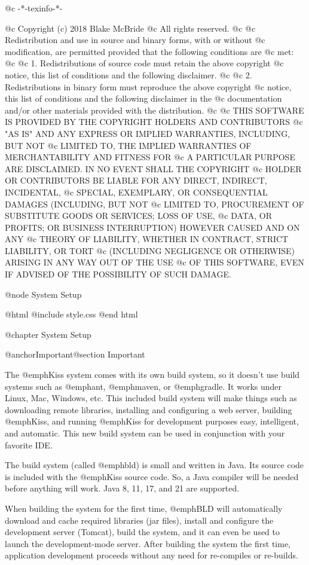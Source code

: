 @c -*-texinfo-*-

@c  Copyright (c) 2018 Blake McBride
@c  All rights reserved.
@c
@c  Redistribution and use in source and binary forms, with or without
@c  modification, are permitted provided that the following conditions are
@c  met:
@c
@c  1. Redistributions of source code must retain the above copyright
@c  notice, this list of conditions and the following disclaimer.
@c
@c  2. Redistributions in binary form must reproduce the above copyright
@c  notice, this list of conditions and the following disclaimer in the
@c  documentation and/or other materials provided with the distribution.
@c
@c  THIS SOFTWARE IS PROVIDED BY THE COPYRIGHT HOLDERS AND CONTRIBUTORS
@c  "AS IS" AND ANY EXPRESS OR IMPLIED WARRANTIES, INCLUDING, BUT NOT
@c  LIMITED TO, THE IMPLIED WARRANTIES OF MERCHANTABILITY AND FITNESS FOR
@c  A PARTICULAR PURPOSE ARE DISCLAIMED. IN NO EVENT SHALL THE COPYRIGHT
@c  HOLDER OR CONTRIBUTORS BE LIABLE FOR ANY DIRECT, INDIRECT, INCIDENTAL,
@c  SPECIAL, EXEMPLARY, OR CONSEQUENTIAL DAMAGES (INCLUDING, BUT NOT
@c  LIMITED TO, PROCUREMENT OF SUBSTITUTE GOODS OR SERVICES; LOSS OF USE,
@c  DATA, OR PROFITS; OR BUSINESS INTERRUPTION) HOWEVER CAUSED AND ON ANY
@c  THEORY OF LIABILITY, WHETHER IN CONTRACT, STRICT LIABILITY, OR TORT
@c  (INCLUDING NEGLIGENCE OR OTHERWISE) ARISING IN ANY WAY OUT OF THE USE
@c  OF THIS SOFTWARE, EVEN IF ADVISED OF THE POSSIBILITY OF SUCH DAMAGE.


@node System Setup

@html
@include style.css
@end html

@chapter System Setup

@anchor{Important}@section Important

The @emph{Kiss} system comes with its own build system, so it doesn't
use build systems such as @emph{ant}, @emph{maven}, or @emph{gradle}.
It works under Linux, Mac, Windows, etc. This included build system
will make things such as downloading remote libraries, installing and
configuring a web server, building @emph{Kiss}, and running
@emph{Kiss} for development purposes easy, intelligent, and automatic.
This new build system can be used in conjunction with your favorite IDE.

The build system (called @emph{bld}) is small and written in Java.
Its source code is included with the @emph{Kiss} source code.  So, a
Java compiler will be needed before anything will work.  
Java 8, 11, 17, and 21 are supported.

When building the system for the first time, @emph{BLD} will
automatically download and cache required libraries (jar files), install and
configure the development server (Tomcat), build the system, and it
can even be used to launch the development-mode server.  After building
the system the first time, application development proceeds without
any need for re-compiles or re-builds.

